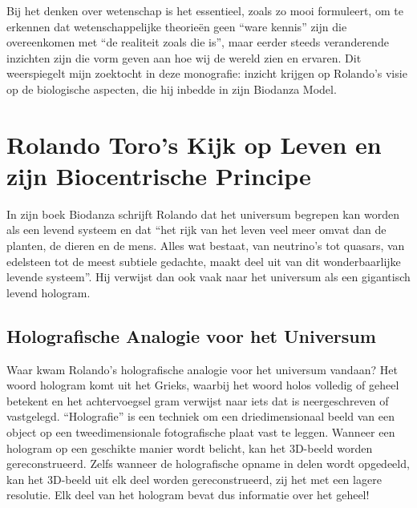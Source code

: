 \documentclass[
  11pt,
]{book}
\begin{document}
Bij het denken over wetenschap is het essentieel, zoals \citet{bohm1980} zo mooi formuleert, om te erkennen dat wetenschappelijke theorieën geen ``ware kennis'' zijn die overeenkomen met ``de realiteit zoals die is'', maar eerder steeds veranderende inzichten zijn die vorm geven aan hoe wij de wereld zien en ervaren. Dit weerspiegelt mijn zoektocht in deze monografie: inzicht krijgen op Rolando's visie op de biologische aspecten, die hij inbedde in zijn Biodanza Model.

\hypertarget{rolando-toros-kijk-op-leven-en-zijn-biocentrische-principe}{%
\section{Rolando Toro's Kijk op Leven en zijn Biocentrische Principe}\label{rolando-toros-kijk-op-leven-en-zijn-biocentrische-principe}}

In zijn boek Biodanza schrijft Rolando dat het universum begrepen kan worden als een levend systeem en dat ``het rijk van het leven veel meer omvat dan de planten, de dieren en de mens. Alles wat bestaat, van neutrino's tot quasars, van edelsteen tot de meest subtiele gedachte, maakt deel uit van dit wonderbaarlijke levende systeem''.
Hij verwijst dan ook vaak naar het universum als een gigantisch levend hologram.

\hypertarget{holografische-analogie-voor-het-universum}{%
\subsection{Holografische Analogie voor het Universum}\label{holografische-analogie-voor-het-universum}}

Waar kwam Rolando's holografische analogie voor het universum vandaan? Het woord hologram komt uit het Grieks, waarbij het woord holos volledig of geheel betekent en het achtervoegsel gram verwijst naar iets dat is neergeschreven of vastgelegd. ``Holografie'' is een techniek om een driedimensionaal beeld van een object op een tweedimensionale fotografische plaat vast te leggen. Wanneer een hologram op een geschikte manier wordt belicht, kan het 3D-beeld worden gereconstrueerd. Zelfs wanneer de holografische opname in delen wordt opgedeeld, kan het 3D-beeld uit elk deel worden gereconstrueerd, zij het met een lagere resolutie. Elk deel van het hologram bevat dus informatie over het geheel!
\end{document}
